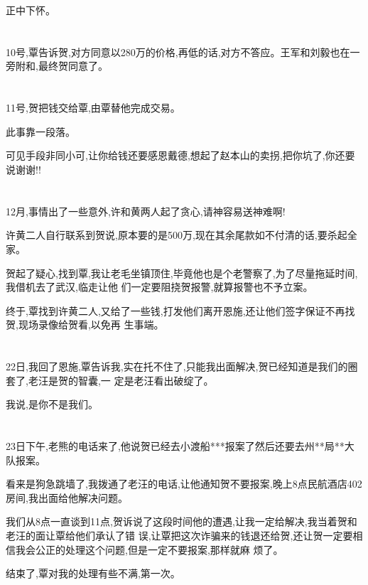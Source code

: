 \documentclass[11pt]{article}
\begin{document}
正中下怀。

\section{}
10号,覃告诉贺,对方同意以280万的价格,再低的话,对方不答应。王军和刘毅也在一旁附和,最终贺同意了。

\section{}
11号,贺把钱交给覃,由覃替他完成交易。

此事靠一段落。


可见手段非同小可,让你给钱还要感恩戴德,想起了赵本山的卖拐,把你坑了,你还要说谢谢!!

\section{}
12月,事情出了一些意外,许和黄两人起了贪心,请神容易送神难啊!

许黄二人自行联系到贺说,原本要的是500万,现在其余尾款如不付清的话,要杀起全家。

贺起了疑心,找到覃,我让老毛坐镇顶住,毕竟他也是个老警察了,为了尽量拖延时间,我借机去了武汉,临走让他
们一定要阻挠贺报警,就算报警也不予立案。

终于,覃找到许黄二人,又给了一些钱,打发他们离开恩施,还让他们签字保证不再找贺,现场录像给贺看,以免再
生事端。

\section{}
22日,我回了恩施,覃告诉我,实在托不住了,只能我出面解决,贺已经知道是我们的圈套了,老汪是贺的智囊,一
定是老汪看出破绽了。

我说,是你不是我们。

\section{}
23日下午,老熊的电话来了,他说贺已经去小渡船***报案了然后还要去州**局**大队报案。

看来是狗急跳墙了,我拨通了老汪的电话,让他通知贺不要报案,晚上8点民航酒店402房间,我出面给他解决问题。

我们从8点一直谈到11点,贺诉说了这段时间他的遭遇,让我一定给解决,我当着贺和老汪的面让覃给他们承认了错
误,让覃把这次诈骗来的钱退还给贺,还让贺一定要相信我会公正的处理这个问题,但是一定不要报案,那样就麻
烦了。

结束了,覃对我的处理有些不满,第一次。
\end{document}

